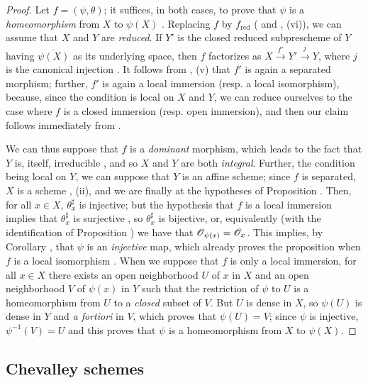 \begin{proof}
\label{proof-1.8.2.8}
Let $f=(\psi,\theta)$; it suffices, in both cases, to prove that $\psi$ is a
{\em homeomorphism} from $X$ to $\psi(X)$ . Replacing $f$ by
$f_\text{red}$ ( and , (vi)), we can assume that $X$
and $Y$ are {\em reduced}. If $Y'$ is the closed reduced subprescheme of $Y$
having $\overline{\psi(X)}$ as its underlying space, then $f$ factorizes as
$X\xrightarrow{f'}Y'\xrightarrow{j}Y$, where $j$ is the canonical injection
. It follows from , (v) that $f'$ is again a
separated morphism; further, $f'$ is again
a local immersion (resp. a local isomorphism), because, since the condition is local on $X$
and $Y$, we can reduce ourselves to the case where $f$ is a closed immersion (resp. open
immersion), and then our claim follows immediately from .

We can thus suppose that $f$ is a {\em dominant} morphism, which leads to the
fact that $Y$ is, itself, irreducible , and so $X$ and $Y$
are both {\em integral}. Further, the condition being local on $Y$, we can
suppose that $Y$ is an affine scheme; since $f$ is separated, $X$ is a scheme
, (ii), and we are finally at the hypotheses of Proposition .
Then, for all $x\in X$, $\theta_x^\sharp$ is injective; but the hypothesis that $f$
is a local immersion implies that $\theta_x^\sharp$ is surjective , so
$\theta_x^\sharp$ is bijective, or, equivalently (with the identification of Proposition
) we have that $\mathscr{O}_{\psi(x)}=\mathscr{O}_x$. This implies, by
Corollary ,
that $\psi$ is an {\em injective} map, which already proves the proposition
when $f$ is a local isomorphism . When we suppose that $f$ is only
a local immersion, for all $x\in X$ there exists an open neighborhood $U$ of
$x$ in $X$ and an open neighborhood $V$ of $\psi(x)$ in $Y$ such that the
restriction of $\psi$ to $U$ is a homeomorphism from $U$ to a {\em closed}
subset of $V$. But $U$ is dense in $X$, so $\psi(U)$ is dense in $Y$ and
{\em a fortiori} in $V$, which proves that $\psi(U)=V$; since $\psi$ is
injective, $\psi^{-1}(V)=U$ and this proves that $\psi$ is a homeomorphism from
$X$ to $\psi(X)$.
\end{proof}

\subsection{Chevalley schemes}
\label{subsection-chevalley-schemes}

